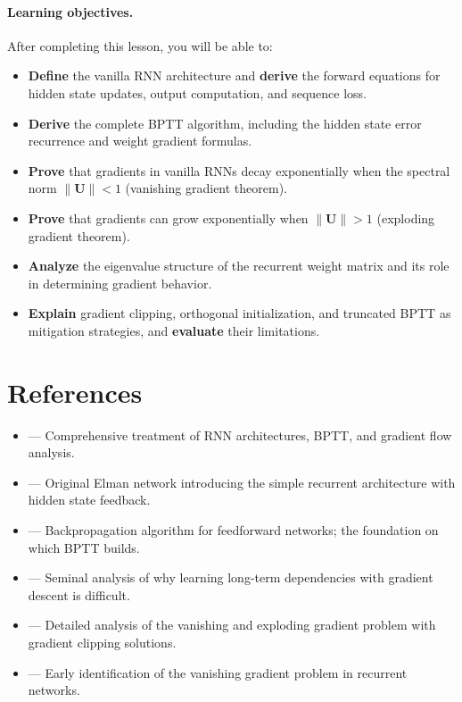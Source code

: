 \documentclass[11pt,a4paper]{article}
\begin{document}
\paragraph{Learning objectives.}
After completing this lesson, you will be able to:
\begin{itemize}[nosep]
  \item \textbf{Define} the vanilla RNN architecture and
    \textbf{derive} the forward equations for hidden state
    updates, output computation, and sequence loss.
  \item \textbf{Derive} the complete BPTT algorithm, including
    the hidden state error recurrence and weight gradient formulas.
  \item \textbf{Prove} that gradients in vanilla RNNs decay
    exponentially when the spectral norm $\|\mathbf{U}\| < 1$
    (vanishing gradient theorem).
  \item \textbf{Prove} that gradients can grow exponentially
    when $\|\mathbf{U}\| > 1$ (exploding gradient theorem).
  \item \textbf{Analyze} the eigenvalue structure of the recurrent
    weight matrix and its role in determining gradient behavior.
  \item \textbf{Explain} gradient clipping, orthogonal initialization,
    and truncated BPTT as mitigation strategies, and \textbf{evaluate}
    their limitations.
\end{itemize}

\section{References}
\label{sec:references}

\begin{itemize}
  \item \citet[Chapter~10]{goodfellow2016} --- Comprehensive treatment
    of RNN architectures, BPTT, and gradient flow analysis.
  \item \citet{elman1990} --- Original Elman network introducing the
    simple recurrent architecture with hidden state feedback.
  \item \citet{rumelhart1986} --- Backpropagation algorithm for
    feedforward networks; the foundation on which BPTT builds.
  \item \citet{bengio1994} --- Seminal analysis of why learning
    long-term dependencies with gradient descent is difficult.
  \item \citet{pascanu2013} --- Detailed analysis of the vanishing
    and exploding gradient problem with gradient clipping solutions.
  \item \citet{hochreiter1991} --- Early identification of the
    vanishing gradient problem in recurrent networks.
\end{itemize}
\end{document}
